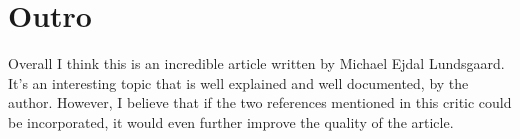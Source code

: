 \documentclass{article}
\begin{document}
\section*{Outro}
Overall I think this is an incredible article written by Michael Ejdal Lundsgaard. It's an interesting topic that is well explained and well documented, by the author. However, I believe that if the two references mentioned in this critic could be incorporated, it would even further improve the quality of the article.
 
 


 
\end{document}
